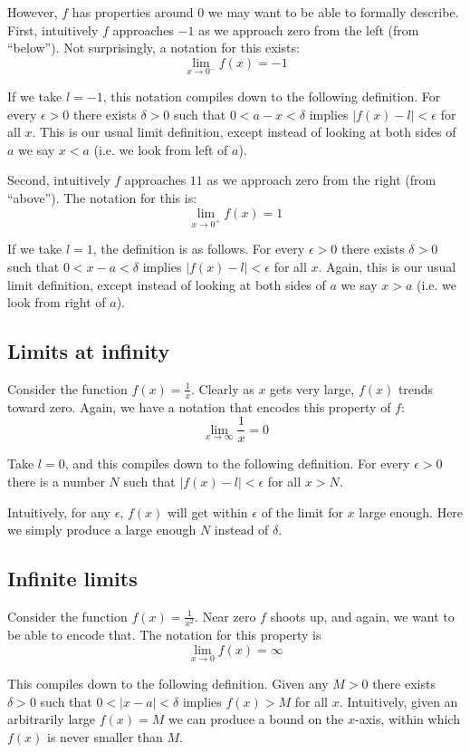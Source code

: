 However, $f$ has properties around $0$ we may want to be able to
formally describe. First, intuitively $f$ approaches $-1$ as we
approach zero from the left (from ``below''). Not surprisingly, a
notation for this exists:
\[\lim_{x\to0^-}f(x)=-1\]

If we take $l=-1$, this notation compiles down to the following
definition. For every $\epsilon>0$ there exists $\delta>0$ such that
$0<a-x<\delta$ implies $|f(x)-l|<\epsilon$ for all $x$. This is our usual limit
definition, except instead of looking at both sides of $a$ we say
$x<a$ (i.e. we look from left of $a$).

\vs

Second, intuitively $f$ approaches $11$ as we approach zero from the
right (from ``above''). The notation for this is:
\[\lim_{x\to0^+}f(x)=1\]

If we take $l=1$, the definition is as follows. For every $\epsilon>0$ there
exists $\delta>0$ such that $0<x-a<\delta$ implies $|f(x)-l|<\epsilon$ for all
$x$. Again, this is our usual limit definition, except instead of
looking at both sides of $a$ we say $x>a$ (i.e. we look from right of
$a$).

\subsection{Limits at infinity}
Consider the function $f(x)=\frac{1}{x}$. Clearly as $x$ gets very
large, $f(x)$ trends toward zero. Again, we have a notation that
encodes this property of $f$:
\[\lim_{x\to\infty}\frac{1}{x}=0\]

Take $l=0$, and this compiles down to the following definition. For
every $\epsilon>0$ there is a number $N$ such that $|f(x)-l|<\epsilon$ for all
$x>N$.

\vs

Intuitively, for any $\epsilon$, $f(x)$ will get within $\epsilon$ of the limit for
$x$ large enough. Here we simply produce a large enough $N$ instead of
$\delta$.

\subsection{Infinite limits}
Consider the function $f(x)=\frac{1}{x^2}$. Near zero $f$ shoots up,
and again, we want to be able to encode that. The notation for this
property is
\[\lim_{x\to0}f(x)=\infty\]

This compiles down to the following definition. Given any $M>0$ there
exists $\delta>0$ such that $0<|x-a|<\delta$ implies $f(x)>M$ for all
$x$. Intuitively, given an arbitrarily large $f(x)=M$ we can produce a
bound on the $x$-axis, within which $f(x)$ is never smaller than $M$.

